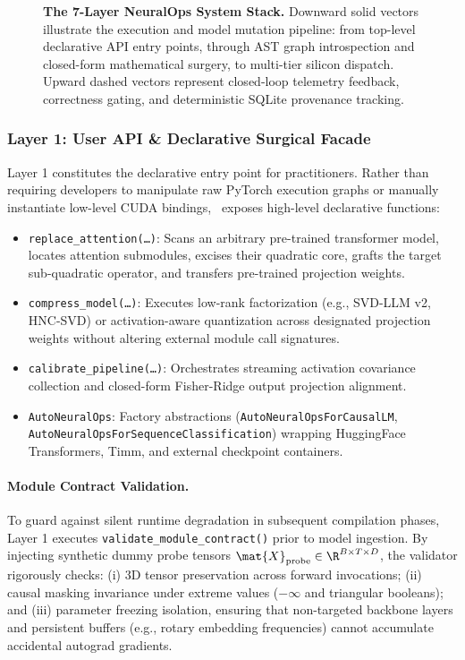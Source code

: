 \begin{figure}[t]
{\begin{tikzpicture}
\end{tikzpicture}%
}
\caption[The 7-Layer NeuralOps System Stack]{\textbf{The 7-Layer NeuralOps System Stack.} Downward solid vectors illustrate the execution and model mutation pipeline: from top-level declarative API entry points, through AST graph introspection and closed-form mathematical surgery, to multi-tier silicon dispatch. Upward dashed vectors represent closed-loop telemetry feedback, correctness gating, and deterministic SQLite provenance tracking.}
\label{fig:neuralops_7layer_stack}
\end{figure}

\subsubsection{Layer 1: User API \& Declarative Surgical Facade}
Layer 1 constitutes the declarative entry point for practitioners. Rather than requiring developers to manipulate raw PyTorch execution graphs or manually instantiate low-level CUDA bindings, \neuralops\ exposes high-level declarative functions:
\begin{itemize}
    \item \texttt{replace\_attention(\dots)}: Scans an arbitrary pre-trained transformer model, locates attention submodules, excises their quadratic core, grafts the target sub-quadratic operator, and transfers pre-trained projection weights.
    \item \texttt{compress\_model(\dots)}: Executes low-rank factorization (e.g., SVD-LLM v2, HNC-SVD) or activation-aware quantization across designated projection weights without altering external module call signatures.
    \item \texttt{calibrate\_pipeline(\dots)}: Orchestrates streaming activation covariance collection and closed-form Fisher-Ridge output projection alignment.
    \item \texttt{AutoNeuralOps}: Factory abstractions (\texttt{AutoNeuralOpsForCausalLM}, \linebreak \texttt{AutoNeuralOpsForSequenceClassification}) wrapping HuggingFace Transformers, Timm, and external checkpoint containers.
\end{itemize}

\paragraph{Module Contract Validation.} To guard against silent runtime degradation in subsequent compilation phases, Layer 1 executes \texttt{validate\_module\_contract()} prior to model ingestion. By injecting synthetic dummy probe tensors $\mat{X}_{\text{probe}} \in \R^{B \times T \times D}$, the validator rigorously checks: (i) 3D tensor preservation across forward invocations; (ii) causal masking invariance under extreme values ($-\infty$ and triangular booleans); and (iii) parameter freezing isolation, ensuring that non-targeted backbone layers and persistent buffers (e.g., rotary embedding frequencies) cannot accumulate accidental autograd gradients.

